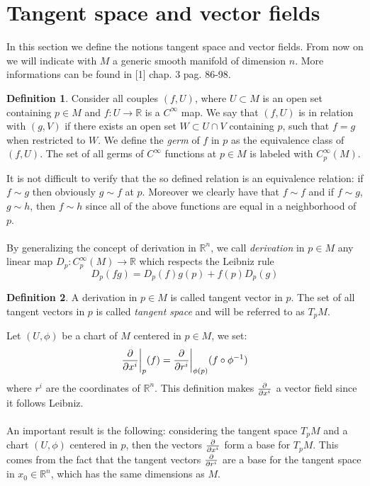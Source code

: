 \documentclass[12pt,a4paper]{report}
\theoremstyle{definition}
\newtheorem{Def}{Definition}[chapter]
\theoremstyle{Theorem}
\theoremstyle{definition}
\theoremstyle{definition}
\begin{document}
	\section{Tangent space and vector fields}
	In this section we define the notions tangent space and vector fields. From now on we will indicate with $M$ a generic smooth manifold of dimension $n$. More informations can be found in [1] chap. 3 pag. 86-98.
	\begin{Def}
		Consider all couples $(f,U)$, where $U\subset M$ is an open set containing $p\in M$ and $f:U\rightarrow \mathbb{R}$ is a $C^\infty$ map. We say that $(f,U)$ is in relation with $(g,V)$ if there exists an open set $W\subset U\cap V$ containing $p$, such that $f=g$ when restricted to $W$. We define the \textit{germ} of $f$ in $p$ as the equivalence class of $(f,U)$.
		The set of all germs of $C^\infty$ functions at $p\in M$ is labeled with $C^\infty_p(M)$.
	\end{Def}
	It is not difficult to verify that the so defined relation is an equivalence relation: if $f\sim g$ then obviously $g\sim f$ at $p$. Moreover we clearly have that $f\sim f$ and if $f\sim g$, $g\sim h$, then $f\sim h$ since all of the above functions are equal in a neighborhood of $p$.\\
	\\
	By generalizing the concept of derivation in $\mathbb{R}^n$, we call \textit{derivation} in $p\in M$ any linear map $D_p:C^\infty_p(M)\rightarrow\mathbb{R}$ which respects the Leibniz rule 
	$$D_p(fg)=D_p(f)g(p)+f(p)D_p(g)$$
	\begin{Def}
		A derivation in $p\in M$ is called tangent vector in $p$. The set of all tangent vectors in $p$ is called \textit{tangent space} and will be referred to as $T_pM$.
	\end{Def} 
	Let $(U,\phi)$ be a chart of $M$ centered in $p\in M$, we set:
	$${\partial\over \partial x^i}\bigg\rvert_p(f)={\partial\over \partial r^i}\bigg\rvert_{\phi(p)}(f\circ \phi^{-1})$$ where $r^i$ are the coordinates of $\mathbb{R}^n$. This definition makes ${\partial\over \partial x^i}$ a vector field since it follows Leibniz.\\
	\\
	An important result is the following: considering the tangent space $T_pM$ and a chart $(U,\phi)$ centered in $p$, then the vectors $\partial\over \partial x^i$ form a base for $T_pM$. This comes from the fact that the tangent vectors $\partial\over \partial r^i$ are a base for the tangent space in $x_0\in\mathbb{R}^n$, which has the same dimensions as $M$.\\
\end{document}
